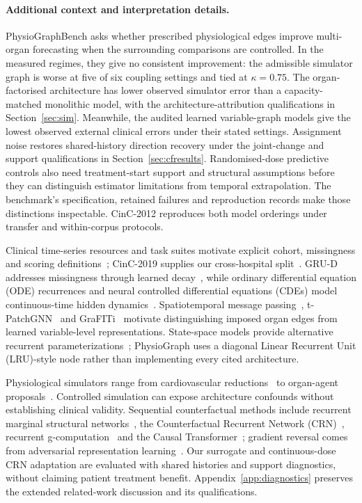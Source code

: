 \paragraph{Additional context and interpretation details.}\label{app:interpretationdetail}
PhysioGraphBench asks whether prescribed physiological edges improve multi-organ forecasting when the surrounding comparisons are controlled. In the measured regimes, they give no consistent improvement: the admissible simulator graph is worse at five of six coupling settings and tied at $\kappa=0.75$. The organ-factorised architecture has lower observed simulator error than a capacity-matched monolithic model, with the architecture-attribution qualifications in Section~\ref{sec:sim}. Meanwhile, the audited learned variable-graph models give the lowest observed external clinical errors under their stated settings. Assignment noise restores shared-history direction recovery under the joint-change and support qualifications in Section~\ref{sec:cfresults}. Randomised-dose predictive controls also need treatment-start support and structural assumptions before they can distinguish estimator limitations from temporal extrapolation. The benchmark's specification, retained failures and reproduction records make those distinctions inspectable. CinC-2012 reproduces both model orderings under transfer and within-corpus protocols. 

Clinical time-series resources and task suites motivate explicit cohort, missingness and scoring definitions~\cite{harutyunyan2019,johnson2023,pollard2018}; CinC-2019 supplies our cross-hospital split~\cite{reyna2020}. GRU-D addresses missingness through learned decay~\cite{che2018}, while ordinary differential equation (ODE) recurrences and neural controlled differential equations (CDEs) model continuous-time hidden dynamics~\cite{rubanova2019,kidger2020}. Spatiotemporal message passing~\cite{yu2018}, t-PatchGNN~\cite{tpatchgnn2024} and GraFITi~\cite{grafiti2024} motivate distinguishing imposed organ edges from learned variable-level representations. State-space models provide alternative recurrent parameterizations~\cite{gu2022,smith2023,orvieto2023,gu2023}; PhysioGraph uses a diagonal Linear Recurrent Unit (LRU)-style node rather than implementing every cited architecture.

Physiological simulators range from cardiovascular reductions~\cite{heldt2010} to organ-agent proposals~\cite{chang2025}. Controlled simulation can expose architecture confounds without establishing clinical validity. Sequential counterfactual methods include recurrent marginal structural networks~\cite{lim2018}, the Counterfactual Recurrent Network (CRN)~\cite{bica2020}, recurrent g-computation~\cite{li2021} and the Causal Transformer~\cite{melnychuk2022}; gradient reversal comes from adversarial representation learning~\cite{ganin2016}. Our surrogate and continuous-dose CRN adaptation are evaluated with shared histories and support diagnostics, without claiming patient treatment benefit. Appendix~\ref{app:diagnostics} preserves the extended related-work discussion and its qualifications.

